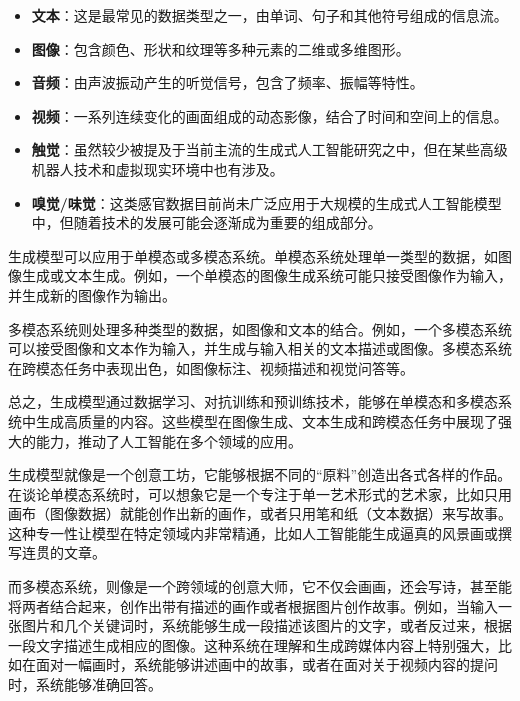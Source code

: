\begin{itemize}
    \item \textbf{文本}：这是最常见的数据类型之一，由单词、句子和其他符号组成的信息流。
    
    \item \textbf{图像}：包含颜色、形状和纹理等多种元素的二维或多维图形。
    
    \item \textbf{音频}：由声波振动产生的听觉信号，包含了频率、振幅等特性。
    
    \item \textbf{视频}：一系列连续变化的画面组成的动态影像，结合了时间和空间上的信息。
    
    \item \textbf{触觉}：虽然较少被提及于当前主流的生成式人工智能研究之中，但在某些高级机器人技术和虚拟现实环境中也有涉及。
    
    \item \textbf{嗅觉/味觉}：这类感官数据目前尚未广泛应用于大规模的生成式人工智能模型中，但随着技术的发展可能会逐渐成为重要的组成部分。
\end{itemize}

生成模型可以应用于单模态或多模态系统。单模态系统处理单一类型的数据，如图像生成或文本生成。例如，一个单模态的图像生成系统可能只接受图像作为输入，并生成新的图像作为输出。

多模态系统则处理多种类型的数据，如图像和文本的结合。例如，一个多模态系统可以接受图像和文本作为输入，并生成与输入相关的文本描述或图像。多模态系统在跨模态任务中表现出色，如图像标注、视频描述和视觉问答等。

总之，生成模型通过数据学习、对抗训练和预训练技术，能够在单模态和多模态系统中生成高质量的内容。这些模型在图像生成、文本生成和跨模态任务中展现了强大的能力，推动了人工智能在多个领域的应用。

生成模型就像是一个创意工坊，它能够根据不同的“原料”创造出各式各样的作品。在谈论单模态系统时，可以想象它是一个专注于单一艺术形式的艺术家，比如只用画布（图像数据）就能创作出新的画作，或者只用笔和纸（文本数据）来写故事。这种专一性让模型在特定领域内非常精通，比如人工智能能生成逼真的风景画或撰写连贯的文章。

而多模态系统，则像是一个跨领域的创意大师，它不仅会画画，还会写诗，甚至能将两者结合起来，创作出带有描述的画作或者根据图片创作故事。例如，当输入一张图片和几个关键词时，系统能够生成一段描述该图片的文字，或者反过来，根据一段文字描述生成相应的图像。这种系统在理解和生成跨媒体内容上特别强大，比如在面对一幅画时，系统能够讲述画中的故事，或者在面对关于视频内容的提问时，系统能够准确回答。

